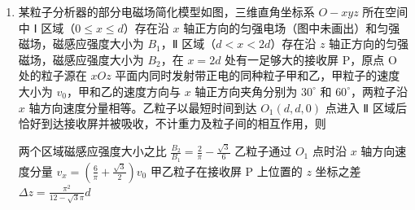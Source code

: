 \documentclass[\gkver]{gaokaozhenti}
\begin{document}
\begin{enumerate}
{	故选 BD。
}

\item
某粒子分析器的部分电磁场简化模型如图，三维直角坐标系 $O-xyz$ 所在空间中 Ⅰ 区域（$0 \leq x \leq d$）存在沿 $x$ 轴正方向的匀强电场（图中未画出）和匀强磁场，磁感应强度大小为 $B_{1}$，Ⅱ 区域（$d < x < 2d$）存在沿 $z$ 轴正方向的匀强磁场，磁感应强度大小为 $B_{2}$，在 $x = 2d$ 处有一足够大的接收屏 P，原点 O 处的粒子源在 $xOz$ 平面内同时发射带正电的同种粒子甲和乙，甲粒子的速度大小为 $v_{0}$，甲和乙的速度方向与 $x$ 轴正方向夹角分别为 $30^\circ$ 和 $60^\circ$，两粒子沿 $x$ 轴方向速度分量相等。乙粒子以最短时间到达 $O_{1}(d, d, 0)$ 点进入 Ⅱ 区域后恰好到达接收屏并被吸收，不计重力及粒子间的相互作用，则

\onepicture[w=6.60cm]{}

{两个区域磁感应强度大小之比 $\frac{B_{2}}{B_{1}} = \frac{2}{\pi} - \frac{\sqrt{3}}{6}$}
{乙粒子通过 $O_{1}$ 点时沿 $x$ 轴方向速度分量 $v_{x} = \left(\frac{6}{\pi} + \frac{\sqrt{3}}{2}\right)v_{0}$}
{甲乙粒子在接收屏 P 上位置的 $z$ 坐标之差 $\Delta z = \frac{\pi^{2}}{12 - \sqrt{3}\pi} d$}

\end{enumerate}
\end{document}
